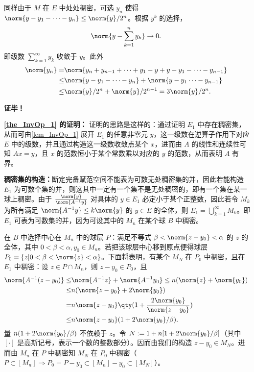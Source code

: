 同样由于 $M$ 在 $E$ 中处处稠密，可选 $y_n$ 使得 $\norm{y-y_1-\cdots-y_n}\leq\norm{y}/2^n$。根据 $y^k$ 的选择，
\begin{equation}
\norm{y-\sum_{k=1}^n y_k}\rightarrow0.~
\end{equation}
即级数 $\sum_{k=1}^\infty y_k$ 收敛于 $y$。此外
\begin{equation}
\begin{aligned}
\norm{y_n}=&\norm{y_n+y_{n-1}+\cdots+y_1-y+y-y_1-\cdots-y_{n-1}}\\
\leq&\norm{y-y_1-\cdots-y_{n}}+\norm{y-y_1\cdots-y_{n-1}}\\
\leq&\norm{y}/2^n+\norm{y}/2^{n-1}=3\norm{y}/2^n.
\end{aligned}~
\end{equation}

\textbf{证毕！}

\textbf{\autoref{the_InvOp_1} 的证明：}
证明的思路是这样的：通过证明 $E_1$ 中存在稠密集，从而可由\autoref{lem_InvOp_1} 展开 $E_1$ 的任意非零元 $y$，这一级数在逆算子作用下对应 $E$ 中的级数，并且通过构造这一级数收敛点某个 $x$，进而由 $A$ 的线性和连续性可知 $Ax=y$，且 $x$ 的范数恒小于某个常数乘以对应的 $y$ 的范数，从而表明 $A$ 有界。

\textbf{稠密集的构造：}断定完备赋范空间不能表为可数无处稠密集的并，因此若能构造 $E_1$ 为可数个集的并，则这其中一定有一个集不是无处稠密的，即有一个集在某一球上稠密。由于 $\frac{\norm{y}}{\norm{A^{-1}y}}$ 对具体的 $y\in E_1$ 必定小于某个正整数，因此若令 $M_k$ 为所有满足 $\norm{A^{-1}y}\leq k\norm{y}$ 的 $y\in E$ 的全体，则 $E_1=\bigcup\limits_{k=1}^\infty M_k$。即 $E_1$ 可表为可数集的并，因为可设其中的 $M_n$ 在某个球 $B$ 中稠密。

在 $B$ 中选择中心在 $M_n$ 中的球层 $P$：满足不等式 $\beta<\norm{z-y_0}<\alpha$ 的 $z$ 的全体，其中 $0<\beta<\alpha,y_0\in M_n$。若把该球层中心移到原点便得球层 $P_0=\{z|0<\beta<\norm{z}<\alpha\}$。下面将表明，有某个 $M_N$ 在 $P_0$ 中稠密，且在 $E_1$ 中稠密：设 $z\in P\cap M_n$，则 $z-y_0\in P_0$，且
\begin{equation}
\begin{aligned}
\norm{A^{-1}(z-y_0)}\leq&\norm{A^{-1}z}+\norm{A^{-1}y_0}\leq n(\norm{z}+\norm{y_0})\\
\leq&n(\norm{z-y_0}+2\norm{y_0})\\
=&n\norm{z-y_0}\qty(1+\frac{2\norm{y_0}}{\norm{z-y_0}})\\
\leq& n\norm{z-y_0}(1+2\norm{y_0}/\beta).
\end{aligned}~
\end{equation}
量 $n(1+2\norm{y_0}/\beta)$ 不依赖于 $z$。令 $N:=1+n[1+2\norm{y_0}/\beta]$（其中 $[\cdot]$ 是高斯记号，表示一个数的整数部分）。因而由我们的构造 $z-y_0\in M_N$。进而由 $M_n$ 在 $P$ 中稠密知 $M_N$ 在 $P_0$ 中稠密（$P\subset[M_n]\Rightarrow P_0=P-y_0\subset[M_n]-y_0\subset[M_N]$）。

